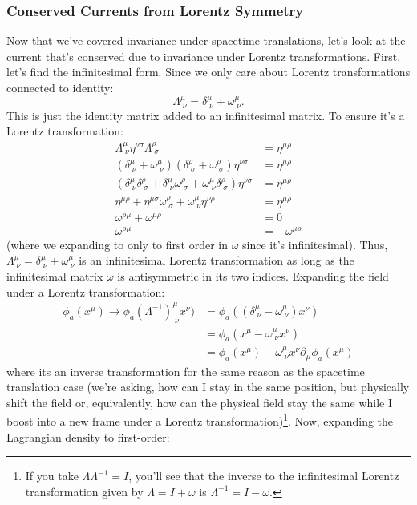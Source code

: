 \subsubsection{Conserved Currents from Lorentz Symmetry}
Now that we've covered invariance under spacetime translations, let's look at the current that's conserved due to invariance under Lorentz transformations. First, let's find the infinitesimal form. Since we only care about Lorentz transformations connected to identity:
\[
    \Lambda^\mu_{\;\nu} = \delta^\mu_{\;\nu} + \omega^\mu_{\;\nu}.
\]
This is just the identity matrix added to an infinitesimal matrix. To ensure it's a Lorentz transformation:
\begin{align*}
    \Lambda^\mu_{\;\nu}\eta^{\nu\sigma}\Lambda^\rho_{\;\sigma} &= \eta^{\mu\rho}\\
    (\delta^\mu_{\;\nu} + \omega^\mu_{\;\nu})(\delta^\rho_{\;\sigma}+\omega^{\rho}_{\;\sigma})\eta^{\nu\sigma}& = \eta^{\mu\rho}\\
    (\delta^\mu_{\;\nu}\delta^\rho_{\;\sigma}+\delta^\mu_{\;\nu}\omega^{\rho}_{\;\sigma} + \omega^\mu_{\;\nu}\delta^{\rho}_{\;\sigma})\eta^{\nu\sigma}&=\eta^{\mu\rho}\\
    \eta^{\mu\rho} + \eta^{\mu\sigma}\omega^{\rho}_{\;\sigma} + \omega^{\mu}_{\;\nu}\eta^{\nu\rho} &= \eta^{\mu\rho}\\
    \omega^{\rho\mu} + \omega^{\mu\rho} & = 0\\
    \omega^{\rho\mu} &= -\omega^{\mu\rho}
\end{align*}
(where we expanding to only to first order in $\omega$ since it's infinitesimal). Thus, $\Lambda^\mu_{\;\nu} = \delta^\mu_{\;\nu} + \omega^\mu_{\;\nu}$ is an infinitesimal Lorentz transformation as long as the infinitesimal matrix $\omega$ is antisymmetric in its two indices. Expanding the field under a Lorentz transformation:
\begin{align*}
    \phi_a(x^\mu)\rightarrow\phi_a(\Lambda^{-1})^\mu_{\;\nu}x^\nu) &= \phi_a((\delta^\mu_{\;\nu}-\omega^\mu_{\;\nu})x^\nu)\\
    &=\phi_a(x^\mu-\omega^\mu_{\;\nu}x^\nu)\\
    &= \phi_a(x^\mu) - \omega^\mu_{\;\nu}x^\nu\partial_\mu\phi_a(x^\mu)
\end{align*}
where its an inverse transformation for the same reason as the spacetime translation case (we're asking, how can I stay in the same position, but physically shift the field or, equivalently, how can the physical field stay the same while I boost into a new frame under a Lorentz transformation)\footnote{If you take $\Lambda\Lambda^{-1}=I$, you'll see that the inverse to the infinitesimal Lorentz transformation given by $\Lambda = I + \omega$ is $\Lambda^{-1} = I - \omega$.}. Now, expanding the Lagrangian density to first-order:
